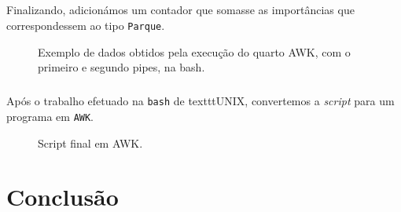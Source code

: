 \documentclass[11pt,a4paper]{report}
\begin{document}
\paragraph*{}Finalizando, adicionámos um contador que somasse as importâncias que correspondessem ao tipo \texttt{Parque}. 

\begin{figure}[H]
\centering
\noindent{}
\caption{Exemplo de dados obtidos pela execução do quarto AWK, com o primeiro e segundo pipes, na bash.}
\end{figure}

\paragraph*{}Após o trabalho efetuado na \texttt{bash} de texttt{UNIX}, convertemos a \textit{script} para um programa em \texttt{AWK}.

\begin{figure}[H]
\centering
\noindent{}
\caption{Script final em AWK.}
\end{figure}


\chapter{Conclusão}
\end{document}
